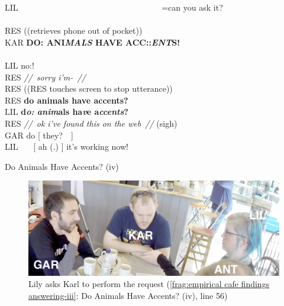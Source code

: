 \begin{revisedsubmission}
\begin{inlinefrag}
    {
    \begin{transcript}[55]
        \by LIL {~~~~~~~~~~~~~~~~~~~~~~~~~~~~~~~~~~=can you ask it?} \\
         \\
        \by RES {((retrieves phone out of pocket))} \\
        \by KAR {\textbf{DO: ANI\emph{MALS} HAVE ACC::\emph{ENT}S!}} \\
         \\
        \by LIL {no:!} \\
        \by RES {\textit{//~sorry i'm-~//}} \\
        \by RES {((RES touches screen to stop utterance))} \\
        \by RES {\textbf{do animals have accents?}} \\
        \by LIL {\textbf{d\emph{o:} \emph{anim}als ha\emph{v}e a\emph{ccents}?}} \\
        \by RES {\textit{//~ok i've found this on the web~//} (sigh)} \\
        \by GAR {do [ they?~~]} \\
        \by LIL {~~~[ ah (.) ] it's working now!} \\
    \end{transcript}
    \caption{Do Animals Have Accents? (iv)}\label{frag:empirical cafe findings answering-iv}
    \begin{figure}[bth]
        \centering
            \includegraphics[width=.7\linewidth]{Graphics/3-2-Empirical-Cafe/FragmentAnimals-3}
        \caption{Lily asks Karl to perform the request (\autoref{frag:empirical cafe findings answering-iii}: Do Animals Have Accents? (iv), line 56)}\label{fig:empirical cafe findings answering-iv}
    \end{figure}
    }
\end{inlinefrag}


\end{revisedsubmission}
